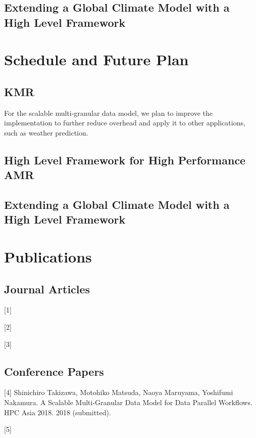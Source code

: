 \documentclass{book}
\begin{document}
\subsection{Extending a Global Climate Model with a High Level Framework}


\section{Schedule and Future Plan}

\subsection{KMR}

For the scalable multi-granular data model, we plan to improve the implementation to further reduce overhead and apply it to other applications, such as weather prediction.


\subsection{High Level Framework for High Performance AMR}

\subsection{Extending a Global Climate Model with a High Level Framework}


\section{Publications}

\subsection{Journal Articles}

[1] 

[2]

[3]

\subsection{Conference Papers}

[4] Shinichiro Takizawa, Motohiko Matsuda, Naoya Maruyama, Yoshifumi Nakamura. A Scalable Multi-Granular Data Model for Data Parallel Workflows. HPC Asia 2018. 2018 (submitted).

[5]
\end{document}
